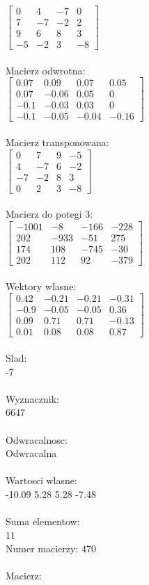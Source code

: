 \documentclass[a4paper,12pt]{article}
\begin{document}
$\begin{bmatrix} 0&4&-7&0\\7&-7&-2&2\\9&6&8&3\\-5&-2&3&-8 \end{bmatrix}$
\\
\\
Macierz odwrotna:\\

$\begin{bmatrix} 0.07&0.09&0.07&0.05\\0.07&-0.06&0.05&0\\-0.1&-0.03&0.03&0\\-0.1&-0.05&-0.04&-0.16 \end{bmatrix}$
\\
\\
Macierz transponowana:\\

$\begin{bmatrix} 0&7&9&-5\\4&-7&6&-2\\-7&-2&8&3\\0&2&3&-8 \end{bmatrix}$
\\
\\
Macierz do potegi 3:\\

$\begin{bmatrix} -1001&-8&-166&-228\\202&-933&-51&275\\174&108&-745&-30\\202&112&92&-379 \end{bmatrix}$
\\
\\
Wektory wlasne:\\

$\begin{bmatrix} 0.42&-0.21&-0.21&-0.31\\-0.9&-0.05&-0.05&0.36\\0.09&0.71&0.71&-0.13\\0.01&0.08&0.08&0.87 \end{bmatrix}$
\\
\\
Slad:\\
-7
\\
\\
Wyznacznik:\\
6647
\\
\\
Odwracalnosc:\\
Odwracalna
\\
\\
Wartosci wlasne:\\
-10.09 5.28 5.28 -7.48
\\
\\
Suma elementow:\\
11
\\
\newpage
Numer macierzy:
470
\\
\\
Macierz:\\
\end{document}

